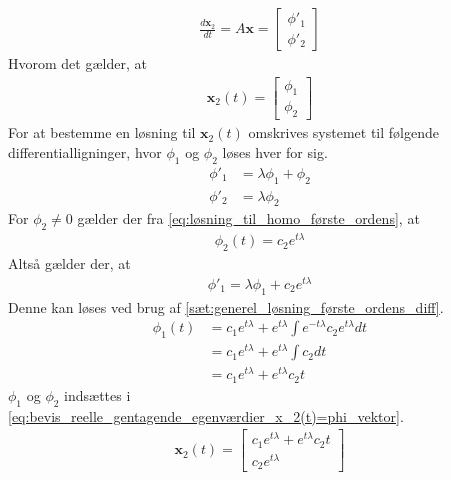 \begin{bev}
\begin{itemize}
    \begin{align}\label{eq:bevis_reelle_gentagende_egenværdier_x'_2(t)=phi_vektor}
         \frac{d\textbf{x}_2}{dt} = A\textbf{x} = \begin{bmatrix}
                            \phi'_1\\
                            \phi'_2
                        \end{bmatrix}
    \end{align}
    Hvorom det gælder, at 
    \begin{align}\label{eq:bevis_reelle_gentagende_egenværdier_x_2(t)=phi_vektor}
        \textbf{x}_2(t) = \begin{bmatrix}
                        \phi_1\\
                        \phi_2
                    \end{bmatrix} 
    \end{align}
    For at bestemme en løsning til $\textbf{x}_2(t)$ omskrives systemet til følgende differentialligninger, hvor $\phi_1$ og $\phi_2$ løses hver for sig.
    \begin{align*}
        \phi'_1 &= \lambda\phi_1 + \phi_2\\
        \phi'_2 &= \lambda\phi_2
    \end{align*}
    For $\phi_2 \neq 0$ gælder der fra \eqref{eq:løsning_til_homo_første_ordens}, at
    \begin{align*}
        \phi_2(t) = c_2e^{t\lambda}
    \end{align*}
    Altså gælder der, at
    \begin{align*}
       \phi'_1 = \lambda\phi_1 + c_2e^{t\lambda}
    \end{align*}
    Denne kan løses ved brug af \autoref{sæt:generel_løsning_første_ordens_diff}. 
    \begin{align*}
        \phi_1(t) &= c_1e^{t\lambda} + e^{t\lambda} \int e^{-t\lambda} c_2 e^{t\lambda} dt\\
        &= c_1e^{t\lambda} + e^{t\lambda} \int c_2 dt\\
        &= c_1e^{t\lambda} + e^{t\lambda}c_2t
    \end{align*}
    $\phi_1$ og $\phi_2$ indsættes i \eqref{eq:bevis_reelle_gentagende_egenværdier_x_2(t)=phi_vektor}.
    \begin{align*}
        \textbf{x}_2(t) =   \begin{bmatrix}
                                c_1e^{t\lambda} + e^{t\lambda}c_2t\\
                                c_2e^{t\lambda}

\end{bmatrix}
\end{align*}
\end{itemize}
\end{bev}
